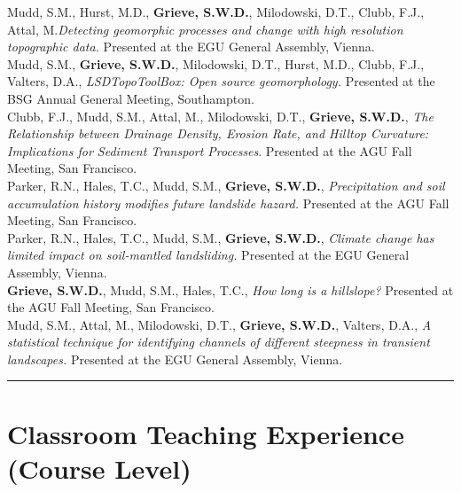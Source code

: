 \documentclass[10pt, a4paper]{article}
\newcommand{\years}[1]{\marginnote{\scriptsize #1}}
\begin{document}
\years{2016}Mudd, S.M., Hurst, M.D., \textbf{Grieve, S.W.D.}, Milodowski, D.T., Clubb, F.J., Attal, M.\textit{Detecting geomorphic processes and change with high resolution topographic data.} Presented at the EGU General Assembly, Vienna.\\[0.05cm]

\years{2015}Mudd, S.M., \textbf{Grieve, S.W.D.}, Milodowski, D.T., Hurst, M.D., Clubb, F.J., Valters, D.A., \textit{LSDTopoToolBox: Open source geomorphology.} Presented at the BSG Annual General Meeting, Southampton.\\[0.05cm]

\years{2015}Clubb, F.J., Mudd, S.M., Attal, M., Milodowski, D.T., \textbf{Grieve, S.W.D.}, \textit{The Relationship between Drainage Density, Erosion Rate, and Hilltop Curvature: Implications for Sediment Transport Processes}. Presented at the AGU Fall Meeting, San Francisco.\\[0.05cm]

\years{2015}Parker, R.N., Hales, T.C., Mudd, S.M., \textbf{Grieve, S.W.D.}, \textit{Precipitation and soil accumulation history modifies future landslide hazard.} Presented at the AGU Fall Meeting, San Francisco.\\[0.05cm]

\years{2015}Parker, R.N., Hales, T.C., Mudd, S.M., \textbf{Grieve, S.W.D.}, \textit{Climate change has limited impact on soil-mantled landsliding.} Presented at the EGU General Assembly, Vienna.\\[0.05cm]

\years{2014}\textbf{Grieve, S.W.D.}, Mudd, S.M., Hales, T.C., \textit{How long is a hillslope?} Presented at the AGU Fall Meeting, San Francisco.\\[0.05cm]

\years{2014}Mudd, S.M., Attal, M., Milodowski, D.T., \textbf{Grieve, S.W.D.}, Valters, D.A., \textit{A statistical technique for identifying channels of different steepness in transient landscapes.} Presented at the EGU General Assembly, Vienna.\\[0.05cm]

\hrule
\section*{Classroom Teaching Experience (Course Level)}
\end{document}
